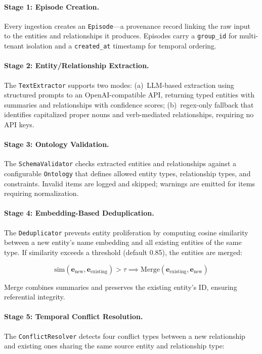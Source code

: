 \documentclass[11pt,a4paper,twocolumn]{article}
\begin{document}
\paragraph{Stage 1: Episode Creation.}
Every ingestion creates an \texttt{Episode}---a provenance record
linking the raw input to the entities and relationships it produces.
Episodes carry a \texttt{group\_id} for multi-tenant isolation and
a \texttt{created\_at} timestamp for temporal ordering.

\paragraph{Stage 2: Entity/Relationship Extraction.}
The \texttt{TextExtractor} supports two modes: (a)~LLM-based
extraction using structured prompts to an OpenAI-compatible API,
returning typed entities with summaries and relationships with
confidence scores; (b)~regex-only fallback that identifies
capitalized proper nouns and verb-mediated relationships, requiring
no API keys.

\paragraph{Stage 3: Ontology Validation.}
The \texttt{SchemaValidator} checks extracted entities and relationships
against a configurable \texttt{Ontology} that defines allowed entity
types, relationship types, and constraints. Invalid items are logged
and skipped; warnings are emitted for items requiring normalization.

\paragraph{Stage 4: Embedding-Based Deduplication.}
The \texttt{Deduplicator} prevents entity proliferation by computing
cosine similarity between a new entity's name embedding and all
existing entities of the same type. If similarity exceeds a threshold
(default 0.85), the entities are merged:

\begin{equation}
\text{sim}(\mathbf{e}_\text{new}, \mathbf{e}_\text{existing}) > \tau
\implies \text{Merge}(\mathbf{e}_\text{existing}, \mathbf{e}_\text{new})
\end{equation}

Merge combines summaries and preserves the existing entity's ID,
ensuring referential integrity.

\paragraph{Stage 5: Temporal Conflict Resolution.}
The \texttt{ConflictResolver} detects four conflict types between
a new relationship and existing ones sharing the same source entity
and relationship type:
\end{document}
